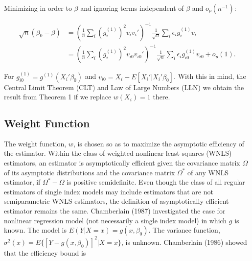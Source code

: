 \documentclass[a4paper]{article}
\begin{document}
Minimizing in order to $\beta$ and ignoring terms independent of $\beta$ and $o_p(n^{-1})$:

\begin{align*}
\sqrt{n}(\beta_0 - \beta) & = (\frac{1}{n}\sum_i(g_{i}^{(1)})^2v_iv_i')^{-1}\frac{1}{\sqrt{n}}\sum_i\epsilon_i g_{i}^{(1)}v_i \\
     					  & = (\frac{1}{n}\sum_i(g_{i}^{(1)})^2v_{i0}v_{i0}')^{-1}\frac{1}{\sqrt{n}}\sum_i\epsilon_i g_{i0}^{(1)}v_{i0} + o_p(1).
\end{align*}

For $g_{i0}^{(1)} = g^{(1)}(X_i'\beta_0)$ and $v_{i0} = X_i - E[X_i'|X_i'\beta_0]$. With this in mind, the Central Limit Theorem (CLT) and Law of Large Numbers (LLN) we obtain the result from Theorem 1 if we replace $w(X_i) = 1$ there.














\subsection{Weight Function} %
\label{sub:Weight Function}

The weight function, $w$, is chosen so as to maximize the asymptotic efficiency of the estimator. Within the class of weighted nonlinear least squares (WNLS) estimators, an estimator is asymptotically efficient given the covariance matrix $\Omega$ of its asymptotic distributions and the covariance matrix $\Omega^*$ of any WNLS estimator, if $\Omega^* - \Omega$ is positive semidefinite. Even though the class of all regular estimators of single index models may include estimators that are not semiparametric WNLS estimators, the definition of asymptotically efficient estimator remains the same. Chamberlain (1987) investigated the case for nonlinear regression model (not necessarily a single index model) in which $g$ is known. The model is $E(Y|X = x) = g(x, \beta_0)$. The variance function, $\sigma^2(x) = E\{[Y - g(x, \beta_0)]^2| X = x\}$, is unknown. Chamberlain (1986) showed that the efficiency bound is 
\end{document}
